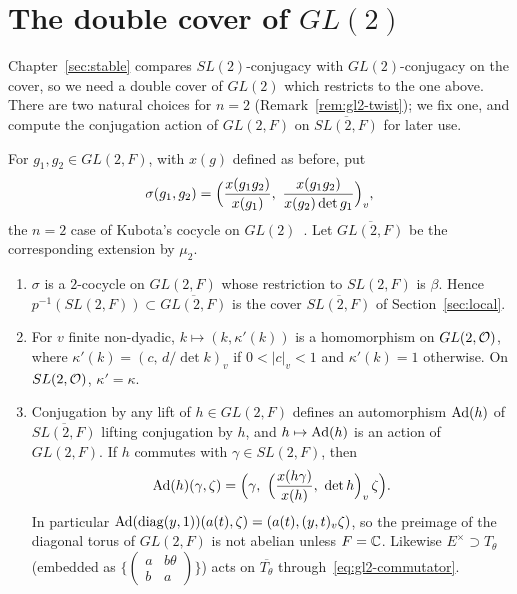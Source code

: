 \section{The double cover of \texorpdfstring{$GL(2)$}{GL(2)}}\label{sec:gl2}

Chapter~\ref{sec:stable} compares $SL(2)$-conjugacy with $GL(2)$-conjugacy on the cover,
so we need a double cover of $GL(2)$ which restricts to the one above.
There are two natural choices for $n=2$ (Remark~\ref{rem:gl2-twist}); we
fix one, and compute the conjugation action of $GL(2,F)$ on
$\overline{SL(2,F)}$ for later use.

For $g_1,g_2\in GL(2,F)$, with $x(g)$ defined as before, put
\begin{equation}\label{eq:sigma-gl2}
\sigma(g_1,g_2)=\Bigl(\frac{x(g_1g_2)}{x(g_1)},\
\frac{x(g_1g_2)}{x(g_2)\det g_1}\Bigr)_v,
\end{equation}
the $n=2$ case of Kubota's cocycle on $GL(2)$~\cite{Ku69,Ge76}. Let
$\overline{GL(2,F)}$ be the corresponding extension by $\mu_2$.

\begin{lemma}\label{lem:gl2}
\begin{enumerate}[label=(\alph*)]
\item $\sigma$ is a $2$-cocycle on $GL(2,F)$ whose restriction to
  $SL(2,F)$ is $\beta$. Hence $p^{-1}(SL(2,F))\subset\overline{GL(2,F)}$
  is the cover $\overline{SL(2,F)}$ of Section~\ref{sec:local}.
\item For $v$ finite non-dyadic, $k\mapsto(k,\kappa'(k))$ is a
  homomorphism on $GL(2,\mathcal{O})$, where $\kappa'(k)=(c,\,d/\det k)_v$ if
  $0<|c|_v<1$ and $\kappa'(k)=1$ otherwise. On $SL(2,\mathcal{O})$,
  $\kappa'=\kappa$.
\item Conjugation by any lift of $h\in GL(2,F)$ defines an automorphism
  $\operatorname{Ad}(h)$ of $\overline{SL(2,F)}$ lifting conjugation by $h$, and
  $h\mapsto\operatorname{Ad}(h)$ is an action of $GL(2,F)$. If $h$ commutes with
  $\gamma\in SL(2,F)$, then
  \begin{equation}\label{eq:gl2-commutator}
  \operatorname{Ad}(h)(\gamma,\zeta)
  =\Bigl(\gamma,\ \Bigl(\frac{x(h\gamma)}{x(h)},\ \det h\Bigr)_v\,\zeta\Bigr).
  \end{equation}
  In particular $\operatorname{Ad}(\operatorname{diag}(y,1))(a(t),\zeta)=(a(t),(y,t)_v\zeta)$,
  so the preimage of the diagonal torus of $GL(2,F)$ is not abelian
  unless $F=\mathbb{C}$. Likewise $E^\times\supset T_\theta$ (embedded as
  $\{\begin{pmatrix}a&b\theta\\b&a\end{pmatrix}\}$) acts on
  $\overline{T_\theta}$ through~\eqref{eq:gl2-commutator}.
\end{enumerate}
\end{lemma}

